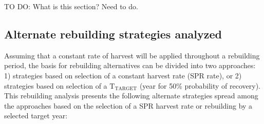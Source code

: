 \documentclass[11pt,
  english,
  a4paper,
]{article}
\begin{document}

TO DO: What is this section? Need to do.

\leavevmode\tagmcend\tagstructend\par


\hypertarget{alternate-rebuilding-strategies-analyzed}{%
\subsection{Alternate rebuilding strategies analyzed}\label{alternate-rebuilding-strategies-analyzed}}

\leavevmode\tagmcend\tagstructend


Assuming that a constant rate of harvest will be applied throughout a rebuilding period, the basis for rebuilding alternatives can be divided into two approaches: 1) strategies based on selection of a constant harvest rate (SPR rate), or 2) strategies based on selection of a {\(\text{T}_\text{TARGET}\)\leavevmode\tagmcend\tagstructend} (year for 50\% probability of recovery). This rebuilding analysis presents the following alternate strategies spread among the approaches based on the selection of a SPR harvest rate or rebuilding by a selected target year:

\leavevmode\tagmcend\tagstructend\par
\end{document}
